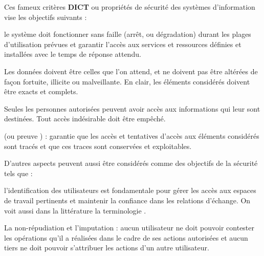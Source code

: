 Ces fameux critères \textbf{\gls{DICT}} ou propriétés de sécurité des systèmes d'information vise les objectifs suivants :
\begin{nota}[DISPONIBILITE]
le système doit fonctionner sans faille (arrêt, ou dégradation) durant les plages d'utilisation prévues et garantir l'accès aux services et ressources définies et installées avec le temps de réponse attendu.
\end{nota}
\begin{nota}[INTEGRITE]
Les données doivent être celles que l'on attend, et ne doivent pas être altérées de façon fortuite, illicite ou malveillante. En clair, les éléments considérés doivent être exacts et complets.
\end{nota}
\begin{nota}[CONFIDENTIALITE] Seules les personnes autorisées peuvent avoir accès aux informations qui leur sont destinées. Tout accès indésirable doit être empêché.
\end{nota}
\begin{nota}[TRACABILITE] (ou preuve ) : garantie que les accès et tentatives d'accès aux éléments considérés sont tracés et que ces traces sont conservées et exploitables.
\end{nota}
D'autres aspects peuvent aussi être considérés comme des objectifs de la sécurité tels que :
\begin{nota}[AUTHENTICITE]
l'identification des utilisateurs est fondamentale pour gérer les accès aux espaces de travail pertinents et maintenir la confiance dans les relations d'échange. On voit aussi dans la littérature la terminologie .
\end{nota}
\begin{nota}
La non-répudiation et l'imputation : aucun utilisateur ne doit pouvoir contester les opérations qu'il a réalisées dans le cadre de ses actions autorisées et aucun tiers ne doit pouvoir s'attribuer les actions d'un autre utilisateur.
\end{nota}

